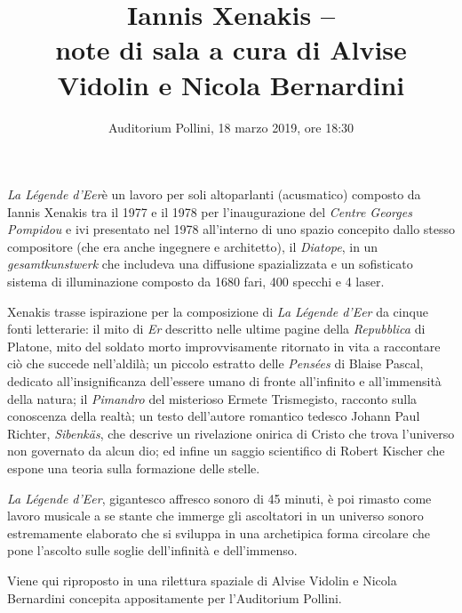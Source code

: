 \documentclass{scrartcl}
\title{Iannis Xenakis -- \LDE\\{\small note di sala a cura di Alvise Vidolin e Nicola Bernardini}}
\date{Auditorium Pollini, 18 marzo 2019, ore 18:30}
\newcommand{\LDE}{\emph{La L\'egende d'Eer}\xspace}
\begin{document}
\maketitle

\LDE \`e un lavoro per soli altoparlanti (acusmatico)
composto da Iannis Xenakis tra il 1977 e il 1978 per l'inaugurazione del
\emph{Centre Georges Pompidou} e ivi presentato nel 1978 all'interno di uno
spazio concepito dallo stesso compositore (che era anche ingegnere e
architetto), il \emph{Diatope}, in un \emph{gesamtkunstwerk} che includeva una
diffusione spazializzata e un sofisticato sistema di illuminazione composto da
1680 fari, 400 specchi e 4 laser.

Xenakis trasse ispirazione per la composizione di \LDE da cinque fonti
letterarie: il mito di \emph{Er} descritto nelle ultime pagine della
\emph{Repubblica} di Platone, mito del soldato morto improvvisamente ritornato
in vita a raccontare ci\`o che succede nell'aldil\`a;
un piccolo estratto delle \emph{Pens\'ees} di Blaise Pascal,
dedicato all'insignificanza dell'essere umano di fronte all'infinito e all'immensit\`a della natura;
il \emph{Pimandro} del misterioso Ermete Trismegisto, racconto sulla
conoscenza della realt\`a;
un testo dell'autore romantico tedesco Johann Paul Richter, \emph{Sibenk\"as},
che descrive un rivelazione onirica di Cristo che trova l'universo non
governato da alcun dio;
ed infine un saggio scientifico di Robert Kischer che espone una teoria sulla
formazione delle stelle.

\LDE, gigantesco affresco sonoro di 45 minuti, \`e poi rimasto come lavoro musicale a se stante
che immerge gli ascoltatori in un universo sonoro estremamente elaborato che
si sviluppa in una archetipica forma circolare che pone l'ascolto sulle soglie
dell'infinit\`a e dell'immenso.

Viene qui riproposto in una rilettura spaziale di Alvise Vidolin e Nicola Bernardini concepita
appositamente per l'Auditorium Pollini.
\end{document}
